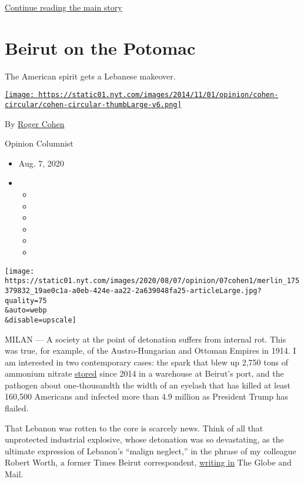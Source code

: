 \protect\hyperlink{after-sponsor}{Continue reading the main story}

\hypertarget{beirut-on-the-potomac}{%
\section{Beirut on the Potomac}\label{beirut-on-the-potomac}}

The American spirit gets a Lebanese makeover.

\href{https://www.nytimes.com/by/roger-cohen}{\texttt{[image: https://static01.nyt.com/images/2014/11/01/opinion/cohen-circular/cohen-circular-thumbLarge-v6.png]}}

By \href{https://www.nytimes.com/by/roger-cohen}{Roger Cohen}

Opinion Columnist

\begin{itemize}
\item
  Aug. 7, 2020
\item
  \begin{itemize}
  \item
  \item
  \item
  \item
  \item
  \item
  \end{itemize}
\end{itemize}

\texttt{[image: https://static01.nyt.com/images/2020/08/07/opinion/07cohen1/merlin\_175379832\_19ae0c1a-a0eb-424e-aa22-2a639048fa25-articleLarge.jpg?quality=75\\\&auto=webp\\\&disable=upscale]}

MILAN --- A society at the point of detonation suffers from internal
rot. This was true, for example, of the Austro-Hungarian and Ottoman
Empires in 1914. I am interested in two contemporary cases: the spark
that blew up 2,750 tons of ammonium nitrate
\href{https://www.nytimes.com/2020/08/05/world/middleeast/beirut-explosion-ship.html}{stored}
since 2014 in a warehouse at Beirut's port, and the pathogen about
one-thousandth the width of an eyelash that has killed at least 160,500
Americans and infected more than 4.9 million as President Trump has
flailed.

That Lebanon was rotten to the core is scarcely news. Think of all that
unprotected industrial explosive, whose detonation was so devastating,
as the ultimate expression of Lebanon's ``malign neglect,'' in the
phrase of my colleague Robert Worth, a former Times Beirut
correspondent,
\href{https://www.theglobeandmail.com/opinion/article-the-rot-at-the-heart-of-lebanon-has-finally-and-grimly-detonated/}{writing
in} The Globe and Mail.

